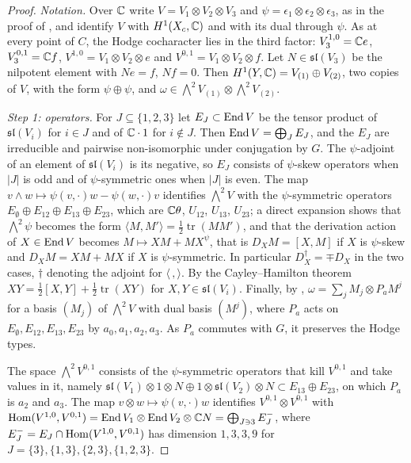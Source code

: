 \begin{proof}
\emph{Notation.} Over $\mathbb{C}$ write $V=V_{1}\otimes V_{2}\otimes V_{3}$ and
$\psi=\epsilon_{1}\otimes\epsilon_{2}\otimes\epsilon_{3}$, as in the proof of
, and identify $V$ with $H^{1}(X_{c},\mathbb{C})$ and with its
dual through $\psi$. As at every point of $C$, the Hodge cocharacter lies in
the third factor: $V_{3}^{1,0}=\mathbb{C} e$, $V_{3}^{0,1}=\mathbb{C} f$, $V^{1,0}=V_{1}
\otimes V_{2}\otimes e$ and $V^{0,1}=V_{1}\otimes V_{2}\otimes f$. Let
$N\in\mathfrak{sl}(V_{3})$ be the nilpotent element with $Ne=f$, $Nf=0$. Then
$H^{1}(Y,\mathbb{C})=V_{(1)}\oplus V_{(2)}$, two copies of $V$, with the form
$\psi\oplus\psi$, and $\omega\in{\textstyle\bigwedge^{2}}V_{(1)}\otimes
{\textstyle\bigwedge^{2}}V_{(2)}$.

\emph{Step 1: operators.} For $J\subseteq\{1,2,3\}$ let $E_{J}\subset\operatorname{End} V$
be the tensor product of $\mathfrak{sl}(V_{i})$ for $i\in J$ and of $\mathbb{C}\cdot1$
for $i\notin J$. Then $\operatorname{End} V=\bigoplus_{J}E_{J}$, and the $E_{J}$ are
irreducible and pairwise non-isomorphic under conjugation by $G$. The
$\psi$-adjoint of an element of $\mathfrak{sl}(V_{i})$ is its negative, so
$E_{J}$ consists of $\psi$-skew operators when $|J|$ is odd and of
$\psi$-symmetric ones when $|J|$ is even. The map $v\wedge w\mapsto
\psi(v,\cdot)w-\psi(w,\cdot)v$ identifies ${\textstyle\bigwedge^{2}}V$ with the
$\psi$-symmetric operators $E_{\emptyset}\oplus E_{12}\oplus E_{13}\oplus
E_{23}$, which are $\mathbb{C}\theta$, $U_{12}$, $U_{13}$, $U_{23}$; a direct
expansion shows that ${\textstyle\bigwedge^{2}}\psi$ becomes the form
$\langle M,M'\rangle=\frac12\operatorname{tr}(MM')$, and that the derivation
action of $X\in\operatorname{End} V$ becomes $M\mapsto XM+MX^{\psi}$, that is
$D_{X}M=[X,M]$ if $X$ is $\psi$-skew and $D_{X}M=XM+MX$ if $X$ is
$\psi$-symmetric. In particular $D_{X}^{\dagger}=\mp D_{X}$ in the two cases,
$\dagger$ denoting the adjoint for $\langle\,,\rangle$. By the Cayley--Hamilton
theorem $XY=\frac12[X,Y]+\frac12\operatorname{tr}(XY)$ for
$X,Y\in\mathfrak{sl}(V_{i})$. Finally, by ,
$\omega=\sum_{j}M_{j}\otimes P_{a}M^{j}$ for a basis $(M_{j})$ of
${\textstyle\bigwedge^{2}}V$ with dual basis $(M^{j})$, where $P_{a}$ acts on
$E_{\emptyset},E_{12},E_{13},E_{23}$ by $a_{0},a_{1},a_{2},a_{3}$. As $P_{a}$
commutes with $G$, it preserves the Hodge types.

The space ${\textstyle\bigwedge^{2}}V^{0,1}$ consists of the $\psi$-symmetric
operators that kill $V^{0,1}$ and take values in it, namely
$\mathfrak{sl}(V_{1})\otimes1\otimes N\oplus1\otimes\mathfrak{sl}(V_{2})
\otimes N\subset E_{13}\oplus E_{23}$, on which $P_{a}$ is $a_{2}$ and $a_{3}$.
The map $v\otimes w\mapsto\psi(v,\cdot)w$ identifies $V^{0,1}\otimes V^{0,1}$
with $\operatorname{Hom}(V^{1,0},V^{0,1})=\operatorname{End} V_{1}\otimes\operatorname{End} V_{2}\otimes\mathbb{C} N=
\bigoplus_{J\ni3}E_{J}^{-}$, where $E_{J}^{-}=E_{J}\cap\operatorname{Hom}(V^{1,0},V^{0,1})$
has dimension $1,3,3,9$ for $J=\{3\},\{1,3\},\{2,3\},\{1,2,3\}$.


\end{proof}

